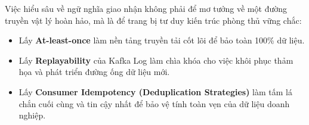 \documentclass[12pt]{article}
\begin{document}
Việc hiểu sâu về ngữ nghĩa giao nhận không phải để mơ tưởng về một đường truyền vật lý hoàn hảo, mà là để trang bị tư duy kiến trúc phòng thủ vững chắc:
\begin{itemize}
    \item Lấy \textbf{At-least-once} làm nền tảng truyền tải cốt lõi để bảo toàn 100\% dữ liệu.
    \item Lấy \textbf{Replayability} của Kafka Log làm chìa khóa cho việc khôi phục thảm họa và phát triển đường ống dữ liệu mới.
    \item Lấy \textbf{Consumer Idempotency (Deduplication Strategies)} làm tấm lá chắn cuối cùng và tin cậy nhất để bảo vệ tính toàn vẹn của dữ liệu doanh nghiệp.
\end{itemize}
\end{document}

